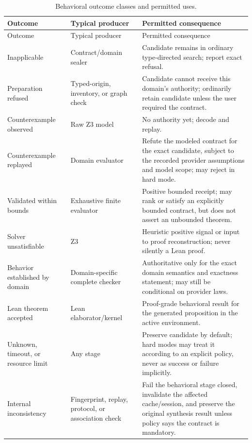 \documentclass[11pt,oneside]{report}
\begin{document}
\begin{longtable}{@{}L{0.19\textwidth}L{0.26\textwidth}L{0.46\textwidth}@{}}
\caption{Behavioral outcome classes and permitted uses.}\label{tab:status-lattice}\\
\toprule
Outcome & Typical producer & Permitted consequence \\
\midrule
\endfirsthead
\toprule
Outcome & Typical producer & Permitted consequence \\
\midrule
\endhead
\bottomrule
\endfoot
Inapplicable & Contract/domain sealer & Candidate remains in ordinary type-directed search; report exact refusal. \\
Preparation refused & Typed-origin, inventory, or graph check & Candidate cannot receive this domain's authority; ordinarily retain candidate unless the user required the contract. \\
Counterexample observed & Raw Z3 model & No authority yet; decode and replay. \\
Counterexample replayed & Domain evaluator & Refute the modeled contract for the exact candidate, subject to the recorded provider assumptions and model scope; may reject in hard mode. \\
Validated within bounds & Exhaustive finite evaluator & Positive bounded receipt; may rank or satisfy an explicitly bounded contract, but does not assert an unbounded theorem. \\
Solver unsatisfiable & Z3 & Heuristic positive signal or input to proof reconstruction; never silently a Lean proof. \\
Behavior established by domain & Domain-specific complete checker & Authoritative only for the exact domain semantics and exactness statement; may still be conditional on provider laws. \\
Lean theorem accepted & Lean elaborator/kernel & Proof-grade behavioral result for the generated proposition in the active environment. \\
Unknown, timeout, or resource limit & Any stage & Preserve candidate by default; hard modes may treat it according to an explicit policy, never as success or failure implicitly. \\
Internal inconsistency & Fingerprint, replay, protocol, or association check & Fail the behavioral stage closed, invalidate the affected cache/session, and preserve the original synthesis result unless policy says the contract is mandatory. \\
\end{longtable}
\end{document}
